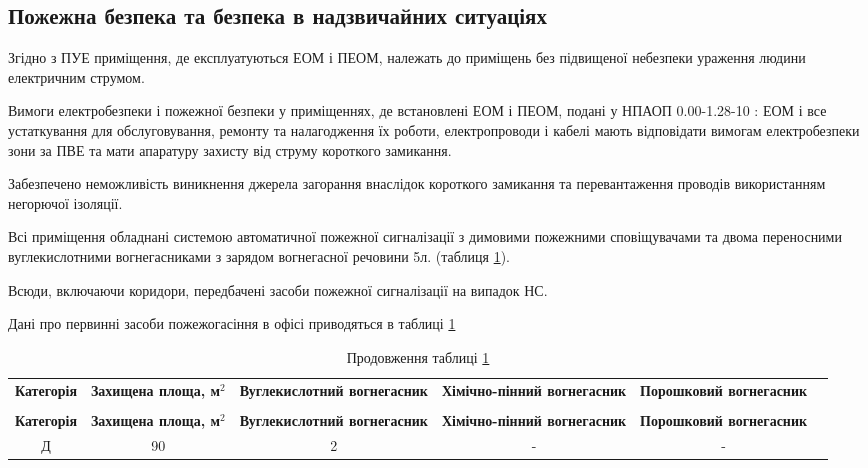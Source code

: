 \subsection{Пожежна безпека та безпека в надзвичайних ситуаціях}
\par Згідно з ПУЕ приміщення, де експлуатуються ЕОМ і ПЕОМ, належать до приміщень без підвищеної небезпеки ураження людини електричним струмом.
\par Вимоги електробезпеки і пожежної безпеки у приміщеннях, де встановлені ЕОМ і ПЕОМ, подані у НПАОП 0.00-1.28-10 \cite{safety_gost_npaop}: ЕОМ і все устаткування для обслуговування, ремонту та налагодження їх роботи, електропроводи і кабелі мають відповідати вимогам електробезпеки зони за ПВЕ та мати апаратуру захисту від струму короткого замикання.

\par Забезпечено неможливість виникнення джерела загорання внаслідок короткого замикання та перевантаження проводів використанням негорючої ізоляції.

\par Всі приміщення обладнані системою автоматичної пожежної сигналізації з димовими пожежними сповіщувачами та двома переносними вуглекислотними вогнегасниками з зарядом вогнегасної речовини 5л. \cite{safety_vogon_nakaz} (таблиця \ref{t:safety_vogon}).

\par Всюди, включаючи коридори, передбачені засоби пожежної сигналізації на випадок НС.

\par Дані про первинні засоби пожежогасіння в офісі приводяться в таблиці \ref{t:safety_vogon}

{\footnotesize
\begin{longtable}{|c|c|c|c|c|c|}
\captionsetup{justification=centering}
\caption{первинні засоби пожежогасіння}\label{t:safety_vogon}\\
\hline
\multicolumn{1}{|c|}{\textbf{Категорія}}&
\multicolumn{1}{p{2cm}|}{\textbf{Захищена площа, м$^2$}}&
\multicolumn{1}{p{3cm}|}{\textbf{Вуглекислотний вогнегасник}}&
\multicolumn{1}{p{2cm}|}{\textbf{Хімічно-пінний вогнегасник}}&
\multicolumn{1}{p{3cm}|}{\textbf{Порошковий вогнегасник}}\\ \hline

\endfirsthead
\caption*{\hfill Продовження таблиці \ref{t:safety_vogon}}\\ \hline

\multicolumn{1}{|c|}{\textbf{Категорія}}&
\multicolumn{1}{p{2cm}|}{\textbf{Захищена площа, м$^2$}}&
\multicolumn{1}{p{3cm}|}{\textbf{Вуглекислотний вогнегасник}}&
\multicolumn{1}{p{2cm}|}{\textbf{Хімічно-пінний вогнегасник}}&
\multicolumn{1}{p{3cm}|}{\textbf{Порошковий вогнегасник}}\\ \hline
\endhead

Д & 90 & 2 & - & -  \\ \hline
\end{longtable}
}

